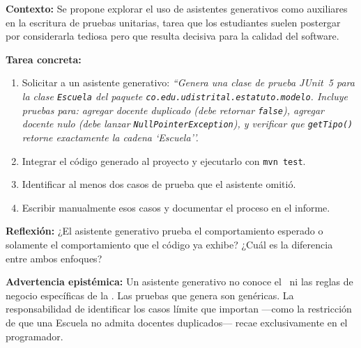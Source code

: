 \begin{tcolorbox}[actividadIA, title={Actividad IA — Sprint 6: Generación de pruebas unitarias}]
\textbf{Contexto:} Se propone explorar el uso de asistentes generativos como auxiliares
en la escritura de pruebas unitarias, tarea que los estudiantes suelen postergar por
considerarla tediosa pero que resulta decisiva para la calidad del software.

\vspace{6pt}
\textbf{Tarea concreta:}
\begin{enumerate}
  \item Solicitar a un asistente generativo: \textit{``Genera una clase de prueba JUnit~5
  para la clase \texttt{Escuela} del paquete \texttt{co.edu.udistrital.estatuto.modelo}.
  Incluye pruebas para: agregar docente duplicado (debe retornar \texttt{false}),
  agregar docente nulo (debe lanzar \texttt{NullPointerException}),
  y verificar que \texttt{getTipo()} retorne exactamente la cadena \textit{`Escuela'}'.}
  \item Integrar el código generado al proyecto y ejecutarlo con \texttt{mvn test}.
  \item Identificar al menos dos casos de prueba que el asistente omitió.
  \item Escribir manualmente esos casos y documentar el proceso en el informe.
\end{enumerate}

\vspace{6pt}
\textbf{Reflexión:} ¿El asistente generativo prueba el comportamiento esperado
o solamente el comportamiento que el código ya exhibe? ¿Cuál es la diferencia
entre ambos enfoques?

\vspace{6pt}
\textbf{Advertencia epistémica:} Un asistente generativo no conoce el \acuerdo\
ni las reglas de negocio específicas de la \ud. Las pruebas que genera son
genéricas. La responsabilidad de identificar los casos límite que importan
---como la restricción de que una Escuela no admita docentes duplicados--- recae
exclusivamente en el programador.
\end{tcolorbox}

\vspace{10pt}

